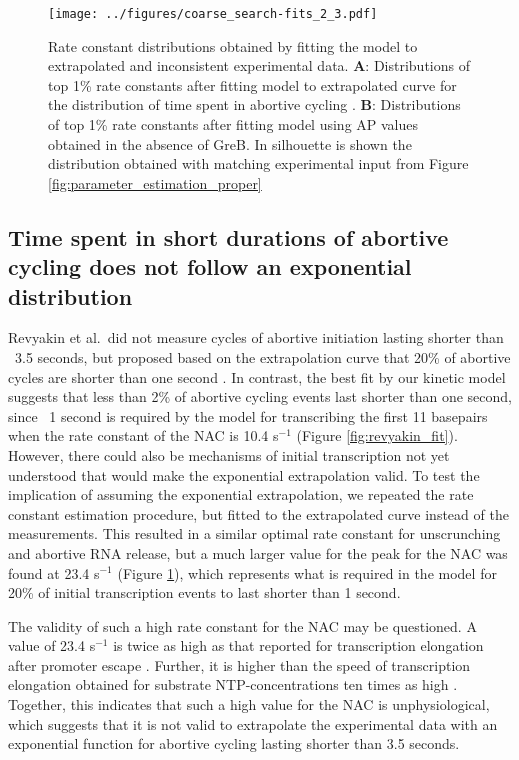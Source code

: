 \begin{figure}
	\begin{center}
      \texttt{[image: ../figures/coarse\_search-fits\_2\_3.pdf]}
	\end{center}
    \caption{
      Rate constant distributions obtained by fitting the model to
      extrapolated and inconsistent experimental data. \textbf{A}:
      Distributions of top 1\% rate constants after fitting model to
      extrapolated curve for the distribution of time spent in abortive
      cycling \cite{revyakin_abortive_2006}. \textbf{B}: Distributions of top
      1\% rate constants after fitting model using AP values obtained in the
      absence of GreB. In silhouette is shown the distribution obtained with
      matching experimental input from Figure \ref{fig:parameter_estimation_proper}}
      \label{fig:extrap_and_GreB_minus_fit}
\end{figure}

\subsection{Time spent in short durations of abortive cycling does not follow
    an exponential distribution}
Revyakin et al.\ did not measure cycles of abortive initiation lasting shorter
than ~3.5 seconds, but proposed based on the extrapolation curve that 20\% of
abortive cycles are shorter than one second \cite{revyakin_abortive_2006}. In
contrast, the best fit by our kinetic model suggests that
less than 2\% of abortive cycling events last shorter than one second, since
~1 second is required by the model for transcribing the first 11 basepairs
when the rate constant of the NAC is 10.4 s$^{-1}$ (Figure
\ref{fig:revyakin_fit}). However, there could also be mechanisms of initial
transcription not yet understood that would make the exponential extrapolation
valid. To test the implication of assuming the exponential extrapolation, we
repeated the rate constant estimation procedure, but fitted to the
extrapolated curve instead of the measurements. This resulted in a similar
optimal rate constant for unscrunching and abortive RNA release, but a much
larger value for the peak for the NAC was found at 23.4 s$^{-1}$ (Figure
\ref{fig:extrap_and_GreB_minus_fit}), which represents what is required in the
model for 20\% of initial transcription events to last shorter than 1 second.

The validity of such a high rate constant for the NAC may be questioned. A
value of 23.4 s$^{-1}$ is twice as high as that reported for transcription
elongation after promoter escape \cite{revyakin_abortive_2006}. Further, it is
higher than the speed of transcription elongation obtained for substrate
NTP-concentrations ten times as high \cite{bai_mechanochemical_2007}.
Together, this indicates that such a high value for the NAC is
unphysiological, which suggests that it is not valid to extrapolate the
experimental data with an exponential function for abortive cycling lasting
shorter than 3.5 seconds.


